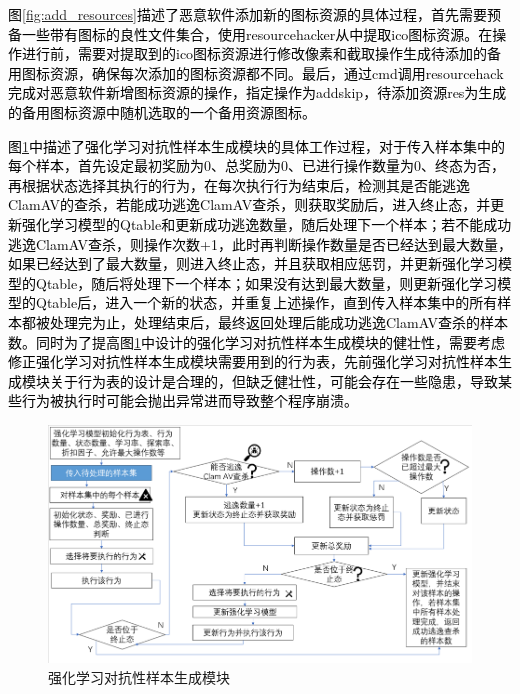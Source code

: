\textcolor{black}{图\ref{fig:add_resources}描述了恶意软件添加新的图标资源的具体过程，首先需要预备一些带有图标的良性文件集合，使用resourcehacker从中提取ico图标资源。在操作进行前，需要对提取到的ico图标资源进行修改像素和截取操作生成待添加的备用图标资源，确保每次添加的图标资源都不同。最后，通过cmd调用resourcehack完成对恶意软件新增图标资源的操作，指定操作为addskip，待添加资源res为生成的备用图标资源中随机选取的一个备用资源图标。}

\textcolor{black}{图\ref{fig:reinforcement_learning_adversarial_sample_generation_module}中描述了强化学习对抗性样本生成模块的具体工作过程，对于传入样本集中的每个样本，首先设定最初奖励为0、总奖励为0、已进行操作数量为0、终态为否，再根据状态选择其执行的行为，在每次执行行为结束后，检测其是否能逃逸ClamAV的查杀，若能成功逃逸ClamAV查杀，则获取奖励后，进入终止态，并更新强化学习模型的Qtable和更新成功逃逸数量，随后处理下一个样本；若不能成功逃逸ClamAV查杀，则操作次数+1，此时再判断操作数量是否已经达到最大数量，如果已经达到了最大数量，则进入终止态，并且获取相应惩罚，并更新强化学习模型的Qtable，随后将处理下一个样本；如果没有达到最大数量，则更新强化学习模型的Qtable后，进入一个新的状态，并重复上述操作，直到传入样本集中的所有样本都被处理完为止，处理结束后，最终返回处理后能成功逃逸ClamAV查杀的样本数。同时为了提高图\ref{fig:reinforcement_learning_adversarial_sample_generation_module}中设计的强化学习对抗性样本生成模块的健壮性，需要考虑修正强化学习对抗性样本生成模块需要用到的行为表，先前强化学习对抗性样本生成模块关于行为表的设计是合理的，但缺乏健壮性，可能会存在一些隐患，导致某些行为被执行时可能会抛出异常进而导致整个程序崩溃。}

\begin{figure}[htbp]
  \centering
  \includegraphics[]{images/reinforcement_learning_adversarial_sample_generation_module.png}
  \caption{强化学习对抗性样本生成模块}\label{fig:reinforcement_learning_adversarial_sample_generation_module}
\end{figure}

